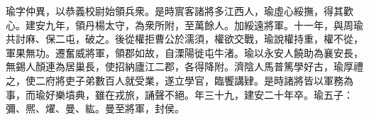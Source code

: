 
\begin{pinyinscope}
瑜字仲異，以恭義校尉始領兵衆。是時賔客諸將多江西人，瑜虛心綏撫，得其歡心。建安九年，領丹楊太守，為衆所附，至萬餘人。加綏遠將軍。十一年，與周瑜共討麻、保二屯，破之。後從權拒曹公於濡須，權欲交戰，瑜說權持重，權不從，軍果無功。遷奮威將軍，領郡如故，自溧陽徙屯牛渚。瑜以永安人饒助為襄安長，無錫人顏連為居巢長，使招納廬江二郡，各得降附。濟陰人馬普篤學好古，瑜厚禮之，使二府將吏子弟數百人就受業，遂立學官，臨饗講肄。是時諸將皆以軍務為事，而瑜好樂墳典，雖在戎旅，誦聲不絕。年三十九，建安二十年卒。瑜五子：彌、熈、燿、曼、紘。曼至將軍，封侯。


\end{pinyinscope}